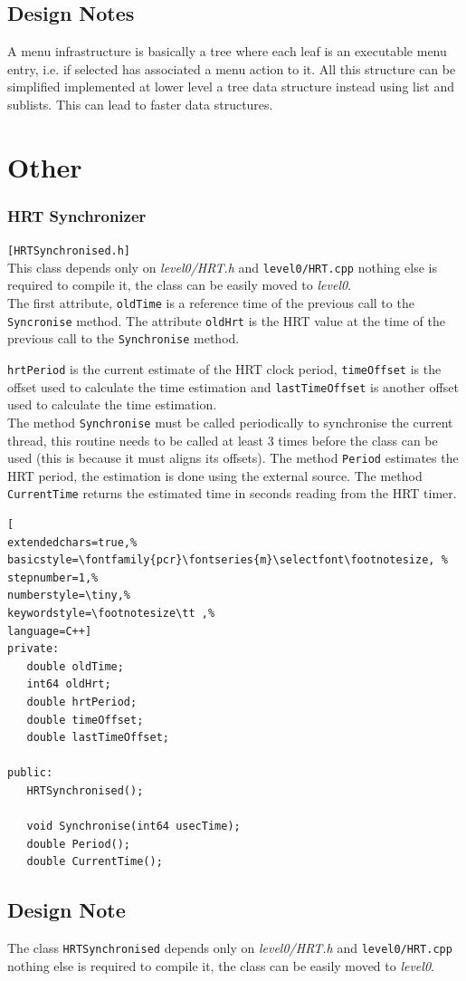 \subsection{Design Notes}
A menu infrastructure is basically a tree where each leaf is an executable menu entry, i.e. if selected has associated a menu action to it. All this structure can be simplified implemented at lower level a tree data structure instead using list and sublists. This can lead to faster data structures.



\section{Other}


\subsubsection{HRT Synchronizer}
\texttt{[HRTSynchronised.h]}\\
This class depends only on \textit{level0/HRT.h} and \texttt{level0/HRT.cpp} nothing else is required to compile it, the class can be easily moved to \textit{level0}.\\


The first attribute, \texttt{oldTime} is a reference time of the previous call to the \texttt{Syncronise} method. The attribute \texttt{oldHrt} is the HRT value at the time of the previous call to the \texttt{Synchronise} method.

\texttt{hrtPeriod} is the current estimate of the HRT clock period, \texttt{timeOffset} is the offset used to calculate the time estimation and \texttt{lastTimeOffset} is another offset used to calculate the time estimation. \\


The method \texttt{Synchronise} must be called periodically to synchronise the current thread, this routine needs to be called at least 3 times before the class can be used (this is because it must aligns its offsets).
The method \texttt{Period} estimates the HRT period, the estimation is done using the external source.
The method \texttt{CurrentTime} returns the estimated time in seconds reading from the HRT timer.
\begin{lstlisting}[
extendedchars=true,%
basicstyle=\fontfamily{pcr}\fontseries{m}\selectfont\footnotesize, %
stepnumber=1,%
numberstyle=\tiny,%
keywordstyle=\footnotesize\tt ,%
language=C++]
private:
   double oldTime;
   int64 oldHrt;
   double hrtPeriod;
   double timeOffset;
   double lastTimeOffset;

public:
   HRTSynchronised();

   void Synchronise(int64 usecTime);
   double Period();
   double CurrentTime();
\end{lstlisting}



\subsection{Design Note}
The class \texttt{HRTSynchronised} depends only on \textit{level0/HRT.h} and \texttt{level0/HRT.cpp} nothing else is required to compile it, the class can be easily moved to \textit{level0}.


